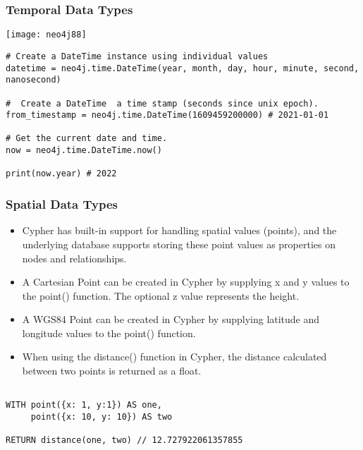 \begin{frame}[fragile]\frametitle{Temporal Data Types}

\begin{center}
\texttt{[image: neo4j88]}
\end{center}	

\begin{lstlisting}
# Create a DateTime instance using individual values
datetime = neo4j.time.DateTime(year, month, day, hour, minute, second, nanosecond)

#  Create a DateTime  a time stamp (seconds since unix epoch).
from_timestamp = neo4j.time.DateTime(1609459200000) # 2021-01-01

# Get the current date and time.
now = neo4j.time.DateTime.now()

print(now.year) # 2022
\end{lstlisting}
\end{frame}

\begin{frame}[fragile]\frametitle{Spatial Data Types}

\begin{itemize}
\item Cypher has built-in support for handling spatial values (points), and the underlying database supports storing these point values as properties on nodes and relationships.
\item A Cartesian Point can be created in Cypher by supplying x and y values to the point() function. The optional z value represents the height.
\item A WGS84 Point can be created in Cypher by supplying latitude and longitude values to the point() function.
\item When using the distance() function in Cypher, the distance calculated between two points is returned as a float.
\end{itemize}

\begin{lstlisting}

WITH point({x: 1, y:1}) AS one,
     point({x: 10, y: 10}) AS two

RETURN distance(one, two) // 12.727922061357855
\end{lstlisting}

\end{frame}